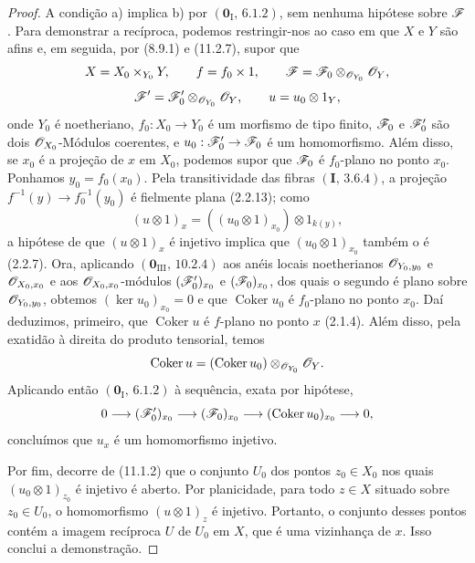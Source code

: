 \begin{proof}
A condição a) implica b) por
$(\mathbf 0_{\mathrm I},\,6.1.2)$, sem nenhuma hipótese
sobre $\mathscr{F}$. Para demonstrar a recíproca, podemos
restringir-nos ao caso em que $X$ e $Y$ são afins e,
em seguida, por (8.9.1) e (11.2.7), supor que
\[
X=X_0\times_{Y_0}Y,\qquad f=f_0\times1,\qquad
\mathscr{F}=\mathscr{F}_0\otimes_{\mathscr{O}_{Y_0}}\mathscr{O}_Y,
\]
\[
\mathscr{F}'=\mathscr{F}'_0\otimes_{\mathscr{O}_{Y_0}}\mathscr{O}_Y,
\qquad u=u_0\otimes1_Y,
\]
onde $Y_0$ é noetheriano, $f_0:X_0\to Y_0$ é um
morfismo de tipo finito, $\mathscr{F}_0$ e $\mathscr{F}'_0$
são dois $\mathscr{O}_{X_0}$-Módulos coerentes, e
$u_0:\sh{F}'_0\to\sh{F}_0$ é um homomorfismo.
Além disso, se $x_0$ é a projeção de $x$ em $X_0$,
podemos supor que $\mathscr{F}_0$ é $f_0$-plano no ponto
$x_0$. Ponhamos $y_0=f_0(x_0)$.
Pela transitividade das fibras $(\mathbf I,\,3.6.4)$,
a projeção $f^{-1}(y)\to f_0^{-1}(y_0)$ é
fielmente plana (2.2.13); como
\[
(u\otimes1)_x=((u_0\otimes1)_{x_0})\otimes1_{k(y)},
\]
a hipótese de que $(u\otimes1)_x$ é injetivo implica
que $(u_0\otimes1)_{x_0}$ também o é (2.2.7).
Ora, aplicando $(\mathbf 0_{\mathrm{III}},\,10.2.4)$
aos anéis locais noetherianos $\mathscr{O}_{Y_0,y_0}$ e
$\mathscr{O}_{X_0,x_0}$ e aos $\mathscr{O}_{X_0,x_0}$-módulos
$(\mathscr{F}'_0)_{x_0}$ e $(\mathscr{F}_0)_{x_0}$, dos quais
o segundo é plano sobre $\mathscr{O}_{Y_0,y_0}$,
obtemos $(\ker u_0)_{x_0}=0$ e que
$\operatorname{Coker}u_0$ é $f_0$-plano no ponto
$x_0$. Daí deduzimos, primeiro, que
$\operatorname{Coker}u$ é $f$-plano no ponto $x$
(2.1.4). Além disso, pela exatidão à direita do
produto tensorial, temos
\[
\operatorname{Coker}u
=(\operatorname{Coker}u_0)
\otimes_{\mathscr{O}_{Y_0}}\mathscr{O}_Y.
\]
Aplicando então $(\mathbf 0_{\mathrm I},\,6.1.2)$
à sequência, exata por hipótese,
\[
0\longrightarrow(\mathscr{F}'_0)_{x_0}
\longrightarrow(\mathscr{F}_0)_{x_0}
\longrightarrow(\operatorname{Coker}u_0)_{x_0}
\longrightarrow0,
\]
concluímos que $u_x$ é um homomorfismo injetivo.

Por fim, decorre de (11.1.2) que o conjunto $U_0$
dos pontos $z_0\in X_0$ nos quais
$(u_0\otimes1)_{z_0}$ é injetivo é aberto.
Por planicidade, para todo $z\in X$ situado
sobre $z_0\in U_0$, o homomorfismo
$(u\otimes1)_z$ é injetivo. Portanto, o conjunto
desses pontos contém a imagem recíproca $U$ de
$U_0$ em $X$, que é uma vizinhança de $x$.
Isso conclui a demonstração.
\end{proof}

